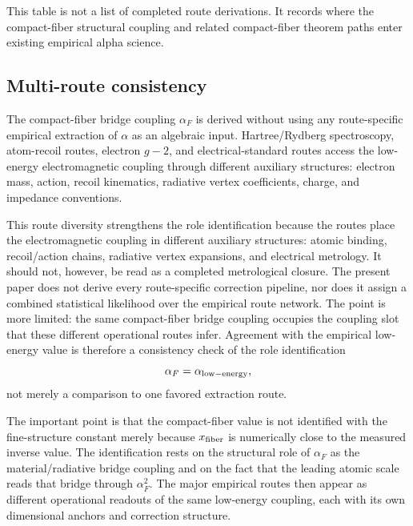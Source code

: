 This table is not a list of completed route derivations. It records where
the compact-fiber structural coupling and related compact-fiber theorem
paths enter existing empirical alpha science.

\subsection{Multi-route consistency}

The compact-fiber bridge coupling \(\alpha_F\) is derived without using
any route-specific empirical extraction of \(\alpha\) as an algebraic
input. Hartree/Rydberg spectroscopy, atom-recoil routes, electron
\(g{-}2\), and electrical-standard routes access the low-energy
electromagnetic coupling through different auxiliary structures:
electron mass, action, recoil kinematics, radiative vertex coefficients,
charge, and impedance conventions.

This route diversity strengthens the role identification because the
routes place the electromagnetic coupling in different auxiliary
structures: atomic binding, recoil/action chains, radiative vertex
expansions, and electrical metrology. It should not, however, be read as
a completed metrological closure. The present paper does not derive every
route-specific correction pipeline, nor does it assign a combined
statistical likelihood over the empirical route network. The point is
more limited: the same compact-fiber bridge coupling occupies the
coupling slot that these different operational routes infer. Agreement
with the empirical low-energy value is therefore a consistency check of
the role identification
\[
\alpha_F=\alpha_{\rm low-energy},
\]
not merely a comparison to one favored extraction route.

The important point is that the compact-fiber value is not identified
with the fine-structure constant merely because \(x_{\rm fiber}\) is
numerically close to the measured inverse value. The identification rests
on the structural role of \(\alpha_F\) as the material/radiative bridge
coupling and on the fact that the leading atomic scale reads that bridge
through \(\alpha_F^2\). The major empirical routes then appear as
different operational readouts of the same low-energy coupling, each with
its own dimensional anchors and correction structure.